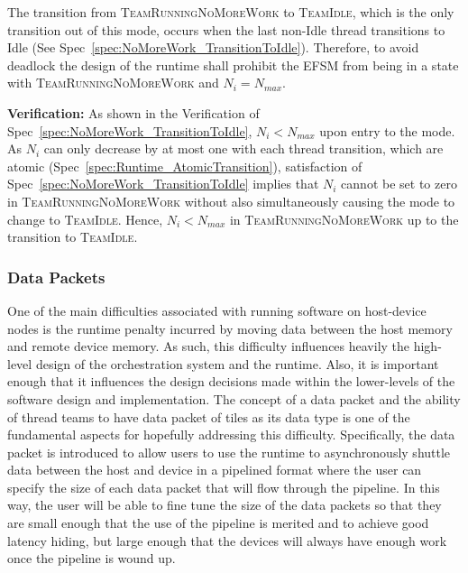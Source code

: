\documentclass{article}
\newcommand{\TeamIdle}          {\textsc{TeamIdle}}
\newcommand{\TeamRunningNoMoreWork} {\textsc{TeamRunningNoMoreWork}}
\begin{document}
\begin{spec}
\label{spec:NoMoreWork_NeedThread}
The transition from {\TeamRunningNoMoreWork} to \TeamIdle, which is the only
transition out of this mode, occurs when the last non-Idle thread transitions to
Idle (See Spec~\ref{spec:NoMoreWork_TransitionToIdle}).  Therefore, to avoid
deadlock the design of the runtime shall prohibit the EFSM from being in a state
with {\TeamRunningNoMoreWork} and $N_i = N_{max}$.
\end{spec}
\textbf{Verification:}\hspace{0.125in} As shown in the Verification of
Spec~\ref{spec:NoMoreWork_TransitionToIdle},  $N_i < N_{max}$ upon entry to the
mode.  As $N_i$ can only decrease by at most one with each thread transition,
which are atomic (Spec~\ref{spec:Runtime_AtomicTransition}), satisfaction of
Spec~\ref{spec:NoMoreWork_TransitionToIdle} implies that $N_i$ cannot be set to
zero in {\TeamRunningNoMoreWork} without also simultaneously causing the mode to
change to \TeamIdle.  Hence, $N_i < N_{max}$ in {\TeamRunningNoMoreWork} up to
the transition to \TeamIdle.

\subsubsection{Data Packets}

One of the main difficulties associated with running software on host-device
nodes is the runtime penalty incurred by moving data between the host memory and
remote device memory.  As such, this difficulty influences heavily the
high-level design of the orchestration system and the runtime.  Also, it is
important enough that it influences the design decisions made within the
lower-levels of the software design and implementation.  The concept of a data
packet and the ability of thread teams to have data packet of tiles as its data
type is one of the fundamental aspects for hopefully addressing this difficulty.
Specifically, the data packet is introduced to allow users to use
the runtime to asynchronously shuttle data between the host and device in a
pipelined format where the user can specify the size of each data packet that
will flow through the pipeline.  In this way, the user will be able to fine tune
the size of the data packets so that they are small enough that the use of the
pipeline is merited and to achieve good latency hiding, but large enough that
the devices will always have enough work once the pipeline is wound up.\\
\end{document}
